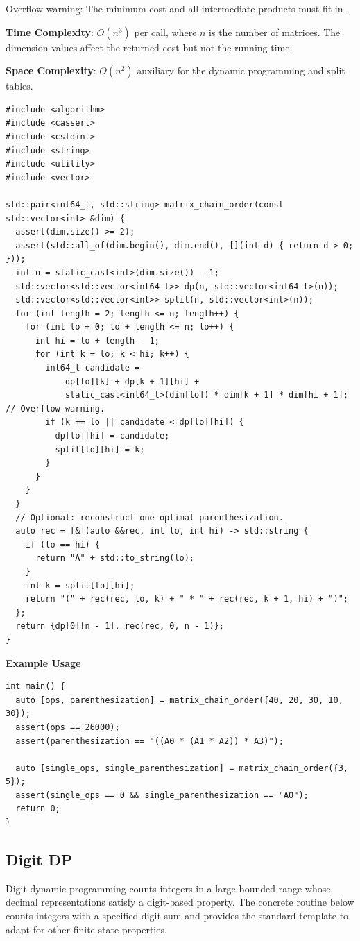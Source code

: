 Overflow warning: The minimum cost and all intermediate products must fit in .

\textbf{Time Complexity}: $O(n^{3})$ per call, where $n$ is the number of matrices. The dimension values affect the returned cost but not the running time.

\textbf{Space Complexity}: $O(n^{2})$ auxiliary for the dynamic programming and split tables.

\begin{lstlisting}[style=cpp]
#include <algorithm>
#include <cassert>
#include <cstdint>
#include <string>
#include <utility>
#include <vector>

std::pair<int64_t, std::string> matrix_chain_order(const std::vector<int> &dim) {
  assert(dim.size() >= 2);
  assert(std::all_of(dim.begin(), dim.end(), [](int d) { return d > 0; }));
  int n = static_cast<int>(dim.size()) - 1;
  std::vector<std::vector<int64_t>> dp(n, std::vector<int64_t>(n));
  std::vector<std::vector<int>> split(n, std::vector<int>(n));
  for (int length = 2; length <= n; length++) {
    for (int lo = 0; lo + length <= n; lo++) {
      int hi = lo + length - 1;
      for (int k = lo; k < hi; k++) {
        int64_t candidate =
            dp[lo][k] + dp[k + 1][hi] +
            static_cast<int64_t>(dim[lo]) * dim[k + 1] * dim[hi + 1];  // Overflow warning.
        if (k == lo || candidate < dp[lo][hi]) {
          dp[lo][hi] = candidate;
          split[lo][hi] = k;
        }
      }
    }
  }
  // Optional: reconstruct one optimal parenthesization.
  auto rec = [&](auto &&rec, int lo, int hi) -> std::string {
    if (lo == hi) {
      return "A" + std::to_string(lo);
    }
    int k = split[lo][hi];
    return "(" + rec(rec, lo, k) + " * " + rec(rec, k + 1, hi) + ")";
  };
  return {dp[0][n - 1], rec(rec, 0, n - 1)};
}
\end{lstlisting}
\textbf{Example Usage}\par
\begin{lstlisting}[style=cpp]
int main() {
  auto [ops, parenthesization] = matrix_chain_order({40, 20, 30, 10, 30});
  assert(ops == 26000);
  assert(parenthesization == "((A0 * (A1 * A2)) * A3)");

  auto [single_ops, single_parenthesization] = matrix_chain_order({3, 5});
  assert(single_ops == 0 && single_parenthesization == "A0");
  return 0;
}
\end{lstlisting}
\subsection{Digit DP}
\label{sec:1.3.6}
Digit dynamic programming counts integers in a large bounded range whose decimal representations satisfy a digit-based property. The concrete routine below counts integers with a specified digit sum and provides the standard template to adapt for other finite-state properties.

